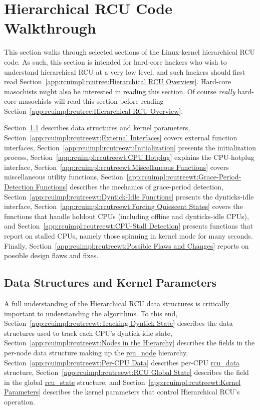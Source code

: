 
\section{Hierarchical RCU Code Walkthrough}
\label{app:rcuimpl:rcutreewt:Hierarchical RCU Code Walkthrough}

This section walks through selected sections of the Linux-kernel
hierarchical RCU code.
As such, this section is intended for hard-core hackers who wish
to understand hierarchical RCU at a very low level, and such hackers
should first read
Section~\ref{app:rcuimpl:rcutree:Hierarchical RCU Overview}.
Hard-core masochists might also be interested in reading this section.
Of course \emph{really} hard-core masochists will read this section
before reading
Section~\ref{app:rcuimpl:rcutree:Hierarchical RCU Overview}.

Section~\ref{app:rcuimpl:rcutreewt:Data Structures and Kernel Parameters}
describes data structures and kernel parameters,
Section~\ref{app:rcuimpl:rcutreewt:External Interfaces}
covers external function interfaces,
Section~\ref{app:rcuimpl:rcutreewt:Initialization}
presents the initialization process,
Section~\ref{app:rcuimpl:rcutreewt:CPU Hotplug}
explains the CPU-hotplug interface,
Section~\ref{app:rcuimpl:rcutreewt:Miscellaneous Functions}
covers miscellaneous utility functions,
Section~\ref{app:rcuimpl:rcutreewt:Grace-Period-Detection Functions}
describes the mechanics of grace-period detection,
Section~\ref{app:rcuimpl:rcutreewt:Dyntick-Idle Functions}
presents the dynticks-idle interface,
Section~\ref{app:rcuimpl:rcutreewt:Forcing Quiescent States}
covers the functions that handle holdout CPUs (including offline and
dynticks-idle CPUs), and
Section~\ref{app:rcuimpl:rcutreewt:CPU-Stall Detection}
presents functions that report on stalled CPUs, namely those spinning
in kernel mode for many seconds.
Finally,
Section~\ref{app:rcuimpl:rcutreewt:Possible Flaws and Changes}
reports on possible design flaws and fixes.

\subsection{Data Structures and Kernel Parameters}
\label{app:rcuimpl:rcutreewt:Data Structures and Kernel Parameters}

A full understanding of the Hierarchical RCU data structures is
critically important to understanding the algorithms.
To this end,
Section~\ref{app:rcuimpl:rcutreewt:Tracking Dyntick State}
describes the data structures used to track each CPU's dyntick-idle state,
Section~\ref{app:rcuimpl:rcutreewt:Nodes in the Hierarchy}
describes the fields in the per-node data structure making up the
\url{rcu_node} hierarchy,
Section~\ref{app:rcuimpl:rcutreewt:Per-CPU Data}
describes per-CPU \url{rcu_data} structure,
Section~\ref{app:rcuimpl:rcutreewt:RCU Global State}
describes the field in the global \url{rcu_state} structure,
and
Section~\ref{app:rcuimpl:rcutreewt:Kernel Parameters}
describes the kernel parameters that control Hierarchical RCU's
operation.

